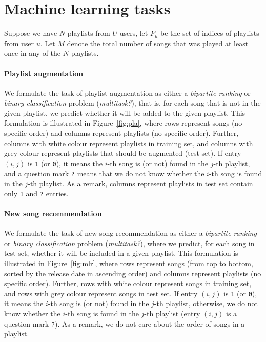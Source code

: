 \section{Machine learning tasks}

Suppose we have $N$ playlists from $U$ users, let $P_u$ be the set of indices of playlists from user $u$.
Let $M$ denote the total number of songs that was played at least once in any of the $N$ playlists.


\paragraph{Playlist augmentation}

We formulate the task of playlist augmentation as either a \emph{bipartite ranking} or \emph{binary classification} problem ({\it multitask?}),
that is, for each song that is not in the given playlist, 
we predict whether it will be added to the given playlist.
This formulation is illustrated in Figure~\ref{fig:pla},
where rows represent songs (no specific order) and columns represent playlists (no specific order).
Further, columns with white colour represent playlists in training set, 
and columns with grey colour represent playlists that should be augmented (\ie test set).
If entry $(i, j)$ is \texttt{1} (or \texttt{0}), 
it means the $i$-th song is (or not) found in the $j$-th playlist, 
and a question mark \texttt{?} means that we do not know whether the $i$-th song is found in the $j$-th playlist.
As a remark, columns represent playlists in test set contain only \texttt{1} and \texttt{?} entries.




\paragraph{New song recommendation}

We formulate the task of new song recommendation as either a \emph{bipartite ranking} or \emph{binary classification} problem ({\it multitask?}),
where we predict, for each song in test set,
whether it will be included in a given playlist.
This formulation is illustrated in Figure~\ref{fig:mlr},
where rows represent songs (from top to bottom, sorted by the release date in ascending order)
and columns represent playlists (no specific order).
Further, rows with white colour represent songs in training set, and rows with grey colour represent songs in test set.
If entry $(i, j)$ is \texttt{1} (or \texttt{0}), it means the $i$-th song is (or not) found in the $j$-th playlist,
otherwise, we do not know whether the $i$-th song is found in the $j$-th playlist (\ie entry $(i, j)$ is a question mark \texttt{?}).
As a remark, we do not care about the order of songs in a playlist.

